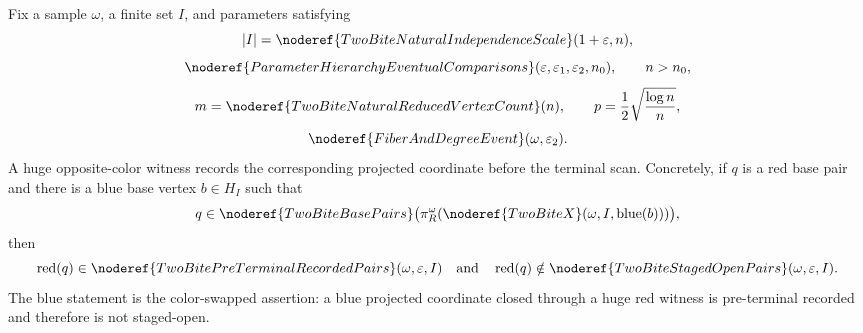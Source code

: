 \begin{helper}
Fix a sample \(\omega\), a finite set \(I\), and parameters satisfying
\[
|I|=\noderef{TwoBiteNaturalIndependenceScale}(1+\varepsilon,n),
\]
\[
\noderef{ParameterHierarchyEventualComparisons}
(\varepsilon,\varepsilon_1,\varepsilon_2,n_0),\qquad n>n_0,
\]
\[
m=\noderef{TwoBiteNaturalReducedVertexCount}(n),\qquad
p=\frac12\sqrt{\frac{\log n}{n}},
\]
\[
\noderef{FiberAndDegreeEvent}(\omega,\varepsilon_2).
\]
A huge opposite-color witness records the corresponding projected coordinate
before the terminal scan.  Concretely, if \(q\) is a red base pair and there
is a blue base vertex \(b\in H_I\) such that
\[
q\in\noderef{TwoBiteBasePairs}
\bigl(\pi_R^\omega(\noderef{TwoBiteX}(\omega,I,\operatorname{blue}(b)))\bigr),
\]
then
\[
\operatorname{red}(q)\in
\noderef{TwoBitePreTerminalRecordedPairs}(\omega,\varepsilon,I)
\quad\text{and}\quad
\operatorname{red}(q)\notin
\noderef{TwoBiteStagedOpenPairs}(\omega,\varepsilon,I).
\]
The blue statement is the color-swapped assertion: a blue projected coordinate
closed through a huge red witness is pre-terminal recorded and therefore is
not staged-open.
\end{helper}
